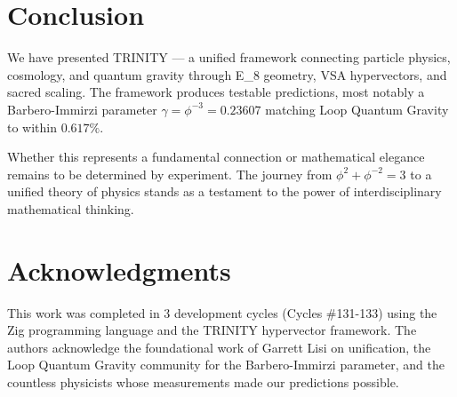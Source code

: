 \documentclass[12pt,a4paper]{article}
\newcommand{\TRINITY}{{\rm TRINITY}}
\newcommand{\EIGHT}{{\rm E}_8}
\begin{document}
\section{Conclusion}

We have presented \TRINITY{} — a unified framework connecting particle physics, cosmology, and quantum gravity through \EIGHT{} geometry, VSA hypervectors, and sacred scaling. The framework produces testable predictions, most notably a Barbero-Immirzi parameter $\gamma = \phi^{-3} = 0.23607$ matching Loop Quantum Gravity to within $0.617\%$.

Whether this represents a fundamental connection or mathematical elegance remains to be determined by experiment. The journey from $\phi^2 + \phi^{-2} = 3$ to a unified theory of physics stands as a testament to the power of interdisciplinary mathematical thinking.

\section*{Acknowledgments}

This work was completed in 3 development cycles (Cycles \#131-133) using the Zig programming language and the \TRINITY{} hypervector framework. The authors acknowledge the foundational work of Garrett Lisi on \Eeight{} unification, the Loop Quantum Gravity community for the Barbero-Immirzi parameter, and the countless physicists whose measurements made our predictions possible.
\end{document}
